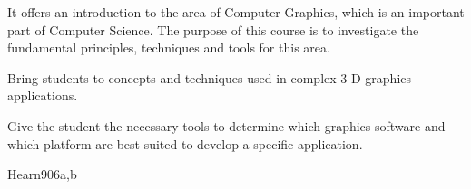 \begin{syllabus}


\begin{justification}
It offers an introduction to the area of Computer Graphics, which is an important part of Computer Science.
The purpose of this course is to investigate the fundamental principles, techniques and tools for this area.
\end{justification}

\begin{goals}
\item Bring students to concepts and techniques used in complex 3-D graphics applications.
\item Give the student the necessary tools to determine which graphics software and which platform are best suited to develop a specific application.
\end{goals}



\begin{unit}{\GVFundamentalConcepts}{}{Hearn90}{6}{a,b}
    \begin{topics}
    	\item \GVFundamentalConceptsTopicMedia
    	\item \GVFundamentalConceptsTopicTradeoffs
    	\item \GVFundamentalConceptsTopicAdditive             
    	\item \GVFundamentalConceptsTopicAnimation
    \end{topics}

    \begin{learningoutcomes}
    	\item \GVFundamentalConceptsLOExplainIn [\Familiarity]
    	\item \GVFundamentalConceptsLODescribeColor [\Familiarity]
    	\item \GVFundamentalConceptsLODescribeTheStoring [\Familiarity] 
    	\item \GVFundamentalConceptsLODescribeTheOfMotion [\Familiarity]
    \end{learningoutcomes}
\end{unit}


\end{syllabus}
